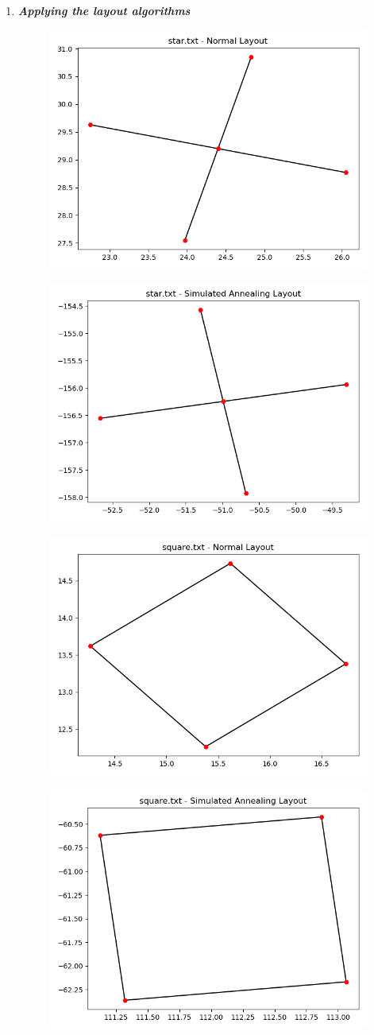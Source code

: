 \documentclass[10pt,a4paper]{article}
\begin{document}
\begin{enumerate}
	
	
	\item \textit{\textbf{Applying the layout algorithms}}\\
	
	
\begin{figure}[H]
	\centering
	\includegraphics[width=0.5\linewidth]{../Scripts/star_normal}
	\caption{}
	\label{fig:starnormal}
\end{figure}

\begin{figure}[H]
	\centering
	\includegraphics[width=0.5\linewidth]{../Scripts/star_annealing}
	\caption{}
	\label{fig:starannealing}
\end{figure}


\begin{figure}[H]
	\centering
	\includegraphics[width=0.5\linewidth]{../Scripts/square_normal}
	\caption{}
	\label{fig:squarenormal}
\end{figure}

\begin{figure}[H]
	\centering
	\includegraphics[width=0.5\linewidth]{../Scripts/square_annealing}
	\caption{}
	\label{fig:squareannealing}
\end{figure}


\end{enumerate}
\end{document}
